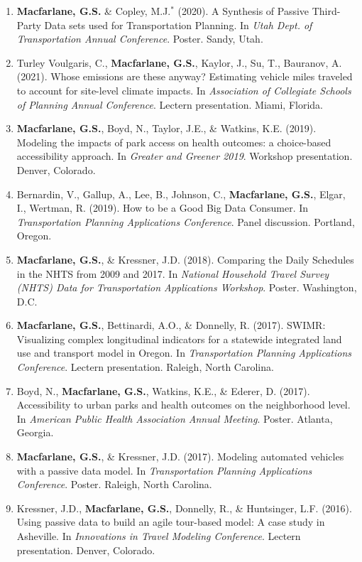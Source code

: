\documentclass[margin,line]{res}
\newif\ifdetail
\newcounter{enuminitialize}
\newenvironment{myenum}[1][]
{%
 \setcounter{enuminitialize}{#1}
 \addtocounter{enuminitialize}{2}
 \begin{enumerate}[left= 4pt, itemsep=12pt, start=\value{enuminitialize}, label=\arabic*\addtocounter{enumi}{-2}]
}
{%
 \end{enumerate}
}
\begin{document}
\begin{resume}
\begin{myenum}[27]
\item \textbf{Macfarlane, G.S.} \& Copley, M.J.$^*$ (2020).  A Synthesis of Passive Third-Party Data sets used for Transportation Planning. In \textit{Utah Dept. of Transportation Annual Conference}. Poster. Sandy, Utah.
\item Turley Voulgaris, C., \textbf{Macfarlane, G.S.}, Kaylor, J., Su, T., Bauranov, A. (2021). Whose emissions are these anyway? Estimating vehicle miles traveled to account for site-level climate impacts. In \textit{Association of Collegiate Schools of Planning Annual Conference}. Lectern presentation. Miami, Florida.
\item \textbf{Macfarlane, G.S.}, Boyd, N., Taylor, J.E., \& Watkins, K.E. (2019). Modeling the impacts of park access on health outcomes: a choice-based accessibility approach. In \textit{ Greater and Greener 2019}. Workshop presentation. Denver, Colorado.
\item Bernardin, V., Gallup, A., Lee, B., Johnson, C., \textbf{Macfarlane, G.S.}, Elgar, I., Wertman, R. (2019). How to be a Good Big Data Consumer. In \textit{ Transportation Planning Applications Conference}. Panel discussion. Portland, Oregon.
\item \textbf{Macfarlane, G.S.}, \& Kressner, J.D. (2018). Comparing the Daily Schedules in the NHTS from 2009 and 2017. In \textit{ National Household Travel Survey (NHTS) Data for Transportation Applications Workshop}. Poster. Washington, D.C.
\item \textbf{Macfarlane, G.S.}, Bettinardi, A.O., \& Donnelly, R. (2017). SWIMR: Visualizing complex longitudinal indicators for a statewide integrated land use and transport model in Oregon. In \textit{Transportation Planning Applications Conference}. Lectern presentation. Raleigh, North Carolina.
\item Boyd, N., \textbf{Macfarlane, G.S.}, Watkins, K.E., \& Ederer, D. (2017). Accessibility to urban parks and health outcomes on the neighborhood level. In \textit{ American Public Health Association Annual Meeting}. Poster. Atlanta, Georgia.
\item \textbf{Macfarlane, G.S.}, \& Kressner, J.D. (2017). Modeling automated vehicles with a passive data model. In \textit{ Transportation Planning Applications Conference}. Poster. Raleigh, North Carolina.
\item Kressner, J.D., \textbf{Macfarlane, G.S.}, Donnelly, R., \& Huntsinger, L.F. (2016). Using passive data to build an agile tour-based model: A case study in Asheville. In \textit{ Innovations in Travel Modeling Conference}. Lectern presentation. Denver, Colorado. \ifdetail Citations: 7  \fi

\end{myenum}
\end{resume}
\end{document}

